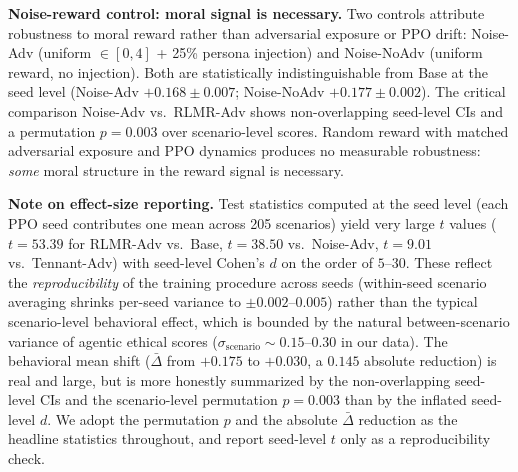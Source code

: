 \documentclass{article}
\newcommand{\rlmr}{\textnormal{RLMR}}
\begin{document}
\textbf{Noise-reward control: moral signal is necessary.} Two controls attribute robustness to moral reward rather than adversarial exposure or PPO drift: Noise-Adv (uniform $\in[0,4]$ + 25\% persona injection) and Noise-NoAdv (uniform reward, no injection). Both are statistically indistinguishable from Base at the seed level (Noise-Adv $+0.168\pm 0.007$; Noise-NoAdv $+0.177\pm 0.002$). The critical comparison Noise-Adv vs.\ \rlmr{}-Adv shows non-overlapping seed-level CIs and a permutation $p{=}0.003$ over scenario-level scores. Random reward with matched adversarial exposure and PPO dynamics produces no measurable robustness: \emph{some} moral structure in the reward signal is necessary.

\textbf{Note on effect-size reporting.} Test statistics computed at the seed level (each PPO seed contributes one mean across 205 scenarios) yield very large $t$ values ($t{=}53.39$ for \rlmr{}-Adv vs.\ Base, $t{=}38.50$ vs.\ Noise-Adv, $t{=}9.01$ vs.\ Tennant-Adv) with seed-level Cohen's $d$ on the order of $5$--$30$. These reflect the \emph{reproducibility} of the training procedure across seeds (within-seed scenario averaging shrinks per-seed variance to $\pm 0.002$--$0.005$) rather than the typical scenario-level behavioral effect, which is bounded by the natural between-scenario variance of agentic ethical scores ($\sigma_{\text{scenario}} \sim 0.15$--$0.30$ in our data). The behavioral mean shift ($\bar\Delta$ from $+0.175$ to $+0.030$, a $0.145$ absolute reduction) is real and large, but is more honestly summarized by the non-overlapping seed-level CIs and the scenario-level permutation $p{=}0.003$ than by the inflated seed-level $d$. We adopt the permutation $p$ and the absolute $\bar\Delta$ reduction as the headline statistics throughout, and report seed-level $t$ only as a reproducibility check.
\end{document}
